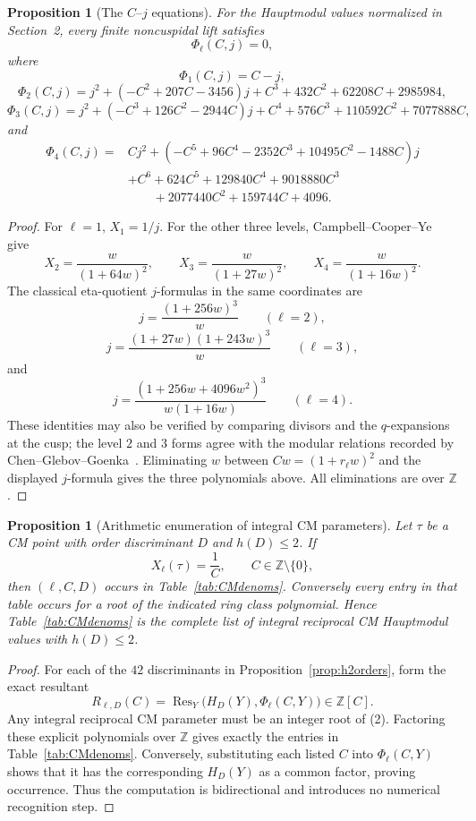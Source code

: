 \documentclass[11pt,a4paper]{amsart} %
\newtheorem{proposition}[theorem]{Proposition}
\theoremstyle{definition}
\begin{document}
\begin{proposition}[The \(C\)--\(j\) equations]\label{prop:Cj}
For the Hauptmodul values normalized in Section~2, every finite noncuspidal lift
satisfies
\[
\Phi_\ell(C,j)=0,
\]
where
\[
\Phi_1(C,j)=C-j,
\]
\[
\Phi_2(C,j)=
j^2+(-C^2+207C-3456)j
+C^3+432C^2+62208C+2985984,
\]
\[
\Phi_3(C,j)=
j^2+(-C^3+126C^2-2944C)j
+C^4+576C^3+110592C^2+7077888C,
\]
and
\[
\begin{aligned}
\Phi_4(C,j)={}&
Cj^2+
(-C^5+96C^4-2352C^3+10495C^2-1488C)j\\
&+C^6+624C^5+129840C^4+9018880C^3\\
&\qquad +2077440C^2+159744C+4096.
\end{aligned}
\]
\end{proposition}

\begin{proof}
For \(\ell=1\), \(X_1=1/j\). For the other three levels,
Campbell--Cooper--Ye~\cite[Table~2]{CCY} give
\[
X_2=\frac{w}{(1+64w)^2},\qquad
X_3=\frac{w}{(1+27w)^2},\qquad
X_4=\frac{w}{(1+16w)^2}.
\]
The classical eta-quotient \(j\)-formulas in the same coordinates are
\[
j=\frac{(1+256w)^3}{w}\qquad(\ell=2),
\]
\[
j=\frac{(1+27w)(1+243w)^3}{w}\qquad(\ell=3),
\]
and
\[
j=\frac{(1+256w+4096w^2)^3}{w(1+16w)}\qquad(\ell=4).
\]
These identities may also be verified by comparing divisors and the
\(q\)-expansions at the cusp; the level \(2\) and \(3\) forms agree with the
modular relations recorded by Chen--Glebov--Goenka~\cite[Table~1]{CGG}.
Eliminating \(w\) between \(Cw=(1+r_\ell w)^2\) and the displayed
\(j\)-formula gives the three polynomials above. All eliminations are over
\(\mathbb Z\).
\end{proof}

\begin{proposition}[Arithmetic enumeration of integral CM parameters]
\label{prop:CMenum}
Let \(\tau\) be a CM point with order discriminant \(D\) and \(h(D)\le2\).
If
\[
X_\ell(\tau)=\frac1C,\qquad C\in\mathbb Z\setminus\{0\},
\]
then \((\ell,C,D)\) occurs in Table~\ref{tab:CMdenoms}. Conversely every
entry in that table occurs for a root of the indicated ring class polynomial.
Hence Table~\ref{tab:CMdenoms} is the complete list of integral reciprocal CM
Hauptmodul values with \(h(D)\le2\).
\end{proposition}

\begin{proof}
For each of the \(42\) discriminants in Proposition~\ref{prop:h2orders}, form
the exact resultant
\[
R_{\ell,D}(C)
=
\operatorname{Res}_Y\bigl(H_D(Y),\Phi_\ell(C,Y)\bigr)
\in\mathbb Z[C].
\tag{2}
\]
Any integral reciprocal CM parameter must be an integer root of (2).
Factoring these explicit polynomials over \(\mathbb Z\) gives exactly the
entries in Table~\ref{tab:CMdenoms}. Conversely, substituting each listed
\(C\) into \(\Phi_\ell(C,Y)\) shows that it has the corresponding \(H_D(Y)\)
as a common factor, proving occurrence. Thus the computation is bidirectional
and introduces no numerical recognition step.
\end{proof}
\end{document}
